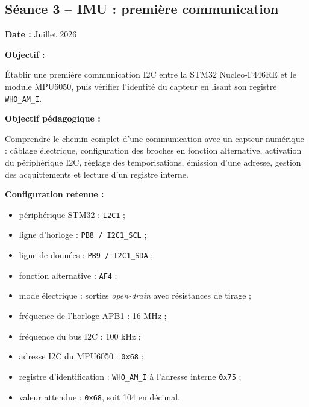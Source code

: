 \documentclass[11pt,a4paper]{article}
\begin{document}
	\subsection*{Séance 3 -- IMU : première communication}
	
	\begin{sessionbox}
		
		\textbf{Date :} Juillet 2026
		
		\vspace{0.3cm}
		
		\textbf{Objectif :}
		
		Établir une première communication I2C entre la STM32 Nucleo-F446RE et le module MPU6050, puis vérifier l'identité du capteur en lisant son registre \texttt{WHO\_AM\_I}.
		
		\vspace{0.3cm}
		
		\textbf{Objectif pédagogique :}
		
		Comprendre le chemin complet d'une communication avec un capteur numérique : câblage électrique, configuration des broches en fonction alternative, activation du périphérique I2C, réglage des temporisations, émission d'une adresse, gestion des acquittements et lecture d'un registre interne.
		
		\vspace{0.3cm}
		
		\textbf{Configuration retenue :}
		
		\begin{itemize}
			\item périphérique STM32 : \texttt{I2C1} ;
			\item ligne d'horloge : \texttt{PB8 / I2C1\_SCL} ;
			\item ligne de données : \texttt{PB9 / I2C1\_SDA} ;
			\item fonction alternative : \texttt{AF4} ;
			\item mode électrique : sorties \textit{open-drain} avec résistances de tirage ;
			\item fréquence de l'horloge APB1 : 16 MHz ;
			\item fréquence du bus I2C : 100 kHz ;
			\item adresse I2C du MPU6050 : \texttt{0x68} ;
			\item registre d'identification : \texttt{WHO\_AM\_I} à l'adresse interne \texttt{0x75} ;
			\item valeur attendue : \texttt{0x68}, soit 104 en décimal.
		\end{itemize}
		

\end{sessionbox}
\end{document}
